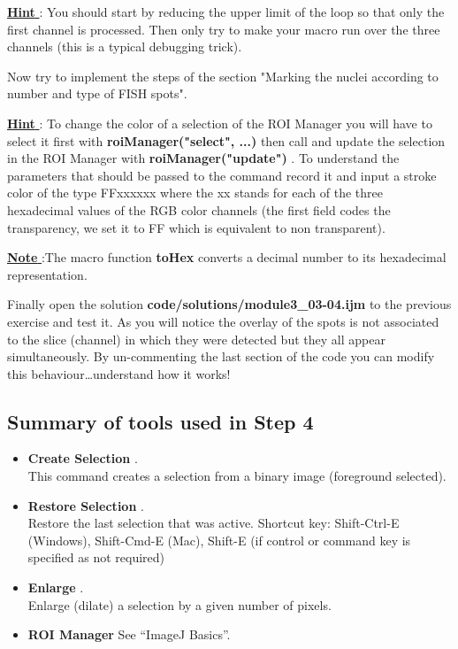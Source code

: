 \underline{\textbf{Hint} }: You should start by reducing the upper limit of the loop so that only the first channel is processed. Then only try to make your macro run over the three channels (this is a typical debugging trick).

Now try to implement the steps of the section "Marking the nuclei according to number and type of FISH spots".

\underline{\textbf{Hint} }: To change the color of a selection of the ROI Manager you will have to select it first with \textbf{roiManager("select", ...)} then call  and update the selection in the ROI Manager with \textbf{roiManager("update")} . To understand the parameters that should be passed to the command record it and input a stroke color of the type FFxxxxxx where the xx stands for each of the three hexadecimal values of the RGB color channels (the first field codes the transparency, we set it to FF which is equivalent to non transparent).

\underline{\textbf{Note} }:The macro function \textbf{toHex} converts a decimal number to its hexadecimal representation.

Finally open the solution \textbf{code/solutions/module3\_03-04.ijm} to the previous exercise and test it. As you will notice the overlay of the spots is not associated to the slice (channel) in which they were detected but they all appear simultaneously. By un-commenting the last section of the code you can modify this behaviour\ldots understand how it works!

\subsection{Summary of tools used in Step 4}

\begin{itemize}
\item \textbf{Create Selection} .\\
This command creates a selection from a binary image (foreground selected).

\item \textbf{Restore Selection} .\\
Restore the last selection that was active. Shortcut key: Shift-Ctrl-E (Windows), Shift-Cmd-E (Mac), Shift-E (if control or command key is specified as not required)

\item \textbf{Enlarge} .\\
Enlarge (dilate) a selection by a given number of pixels.

\item \textbf{ROI Manager} See ``ImageJ Basics''.

\end{itemize}

\newpage